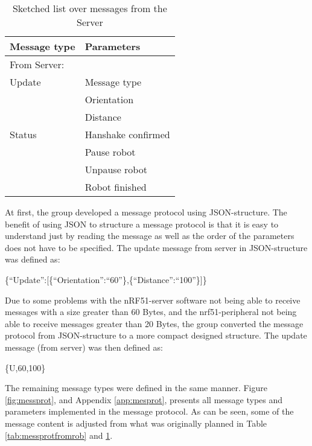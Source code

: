 \begin{table}[ht]
\begin{center}
 \begin{tabular}{|l | l|} 
 \hline
 Message type       &    Parameters \\
 \hline
 \hline
 From Server: & \\
 \hline
 Update              &   Message type \\
                    &   Orientation \\
                    &   Distance \\
 \hline
 Status                &   Hanshake confirmed \\
                    &   Pause robot \\
                    &   Unpause robot \\
                    &   Robot finished \\
 \hline
\end{tabular}
\end{center}
\caption{Sketched list over messages from the Server}
\label{tab:messprotfromser}
\end{table}

At first, the group developed a message protocol using JSON-structure. The benefit of using JSON to structure a message protocol is that it is easy to understand just by reading the message as well as the order of the parameters does not have to be specified. The update message from server in JSON-structure was defined as:

\{``Update'':[\{``Orientation'':``60''\},\{``Distance'':``100''\}]\}

Due to some problems with the nRF51-server software not being able to receive messages with a size greater than 60 Bytes, and the nrf51-peripheral not being able to receive messages greater than 20 Bytes, the group converted the message protocol from JSON-structure to a more compact designed structure. The update message (from server) was then defined as:

\{U,60,100\}

The remaining message types were defined in the same manner. Figure \ref{fig:messprot}, and Appendix \ref{app:mesprot}, presents all message types and parameters implemented in the message protocol. As can be seen, some of the message content is adjusted from what was originally planned in Table \ref{tab:messprotfromrob} and \ref{tab:messprotfromser}.

